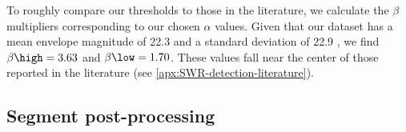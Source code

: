 To roughly compare our thresholds to those in the literature, we calculate the $\beta$ multipliers corresponding to our chosen $\alpha$ values. Given that our dataset has a mean envelope magnitude of 22.3 \uV{} and a standard deviation of 22.9 \uV{}, we find $\beta\high = 3.63$ and $\beta\low = 1.70$. These values fall near the center of those reported in the literature (see \cref{apx:SWR-detection-literature}).




\subsection{Segment post-processing}




